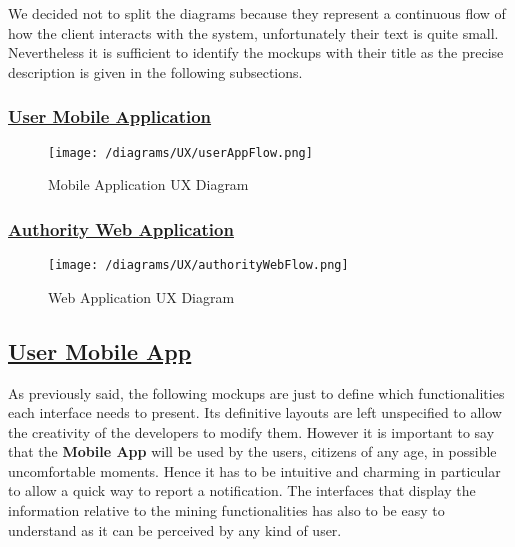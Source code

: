 		We decided not to split the diagrams because they represent a continuous flow of how the client interacts with the system, unfortunately their text is quite small. Nevertheless it is sufficient to identify the mockups with their title as the precise description is given in the following subsections.
		
		\newpage
		
		\subsubsection[User Mobile Application]{\hyperlink{toc}{User Mobile Application}}
			\label{sec:userUXDiagram}
		
			\begin{figure}[ht!]
				\centering
				\texttt{[image: /diagrams/UX/userAppFlow.png]}
				\caption{\label{fig:userAppFlow} Mobile Application UX Diagram}
			\end{figure}
		
			\FloatBarrier
		
		\subsubsection[Authority Web Application]{\hyperlink{toc}{Authority Web Application}}
			\label{sec:authorityUXDiagram}
			
			\begin{figure}[ht!]
				\centering
				\texttt{[image: /diagrams/UX/authorityWebFlow.png]}
				\caption{\label{fig:authorityAppFlow} Web Application UX Diagram}
			\end{figure}
		
			\FloatBarrier
			
	\subsection[User Mobile App]{\hyperlink{toc}{User Mobile App}}
		\label{sec:userMobileApp}
		
		As previously said, the following mockups are just to define which functionalities each interface needs to present. Its definitive layouts are left unspecified to allow the creativity of the developers to modify them. However it is important to say that the \textbf{Mobile App} will be used by the users, citizens of any age, in possible uncomfortable moments. Hence it has to be intuitive and charming in particular to allow a quick way to report a notification. The interfaces that display the information relative to the mining functionalities has also to be easy to understand as it can be perceived by any kind of user.
		
